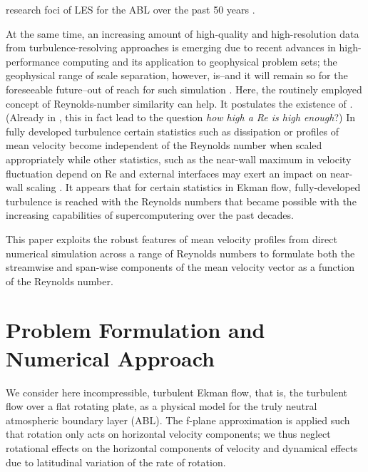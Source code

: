 \documentclass[a4paper,11pt]{amsart}
\newcommand{\RE}{\mathrm{Re}}
\begin{document}
research foci of LES for the ABL over the past 50 years \citep{stoll:BM2020}. 
%
\par
% 
At the same time, an increasing amount of high-quality and high-resolution data from turbulence-resolving approaches
is emerging due to recent advances in high-performance computing and its application to geophysical problem sets;
the geophysical range of scale separation, however, is--and it will remain so for the foreseeable future--out of reach
for such simulation \citep{dimotakis:ARF2005}.
%
Here, the routinely employed concept of Reynolds-number similarity can help. It postulates the existence
of 
\citep{barenblatt:PF1995}.
%
(Already in \citeyear{moin:ARF1998}, this in fact lead \citeauthor{moin:ARF1998} to the question \emph{how high a Re is high enough}?) 
%
In fully developed turbulence certain statistics such as dissipation \citep{dimotakis:ARF2005} or profiles of
mean velocity \citep{barenblatt:JFM1993} become independent of the Reynolds number when scaled appropriately while
other statistics, such as the near-wall maximum in velocity fluctuation depend on $\RE$ \citep{baars:JFM2020a} and external
interfaces may exert an impact on near-wall scaling \citep{dasilva:ARF2014}. 
%
It appears that for certain statistics in Ekman flow, fully-developed turbulence is reached with the
Reynolds numbers that became possible with the increasing capabilities of supercomputering over
the past decades.
%
\par
% 
This paper exploits the robust features of mean velocity profiles from direct numerical
simulation across a range of Reynolds numbers to formulate both the streamwise and span-wise components
of the mean velocity vector as a function of the Reynolds number.
%
\section{Problem Formulation and Numerical Approach}
%
We consider here incompressible, turbulent Ekman flow, that is, the turbulent flow over a flat rotating plate, as
a physical model for the truly neutral atmospheric boundary layer (ABL).
%
The f-plane approximation is applied such that rotation only acts on horizontal velocity components;
we thus neglect rotational effects on the horizontal components of velocity and dynamical effects
due to latitudinal variation of the rate of rotation.
%
\end{document}
